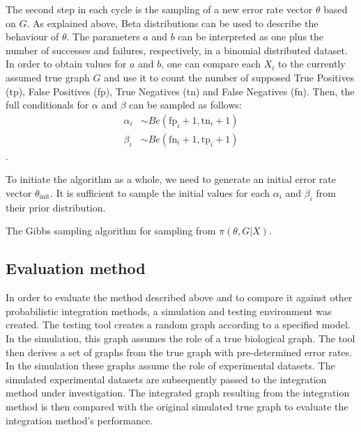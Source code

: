\documentclass{bioinfo}
\begin{document}
\begin{methods}
The second step in each cycle is the sampling of a new error rate vector $\theta$ based on $G$. 
As explained above, Beta distributions can be used to describe the behaviour of $\theta$.
The parameters $a$ and $b$ can be interpreted as one plus the number of successes and failures, respectively, in a binomial distributed dataset. In order to obtain values for $a$ and $b$, one can compare each $X_i$ to the currently assumed true graph $G$ and use it to count the number of supposed True Positives (tp), False Positives (fp), True Negatives (tn) and False Negatives (fn). Then, the full conditionals for $\alpha$ and $\beta$ can be sampled as follows:
\begin{align}
  \alpha_i &\sim Be(\text{fp}_i+1, \text{tn}_i+1)\\
  \beta_i &\sim Be(\text{fn}_i+1, \text{tp}_i+1)
\end{align}.

To initiate the algorithm as a whole, we need to generate an initial error rate vector $\theta_{\text{init}}$. It is sufficient to sample the initial values for each $\alpha_i$ and $\beta_i$ from their prior distribution.

\begin{pseudocode}
  \scriptsize 
  \caption{The Gibbs sampling algorithm for sampling from $\pi(\theta,G|X)$.}
\end{pseudocode}


\subsection{Evaluation method}

In order to evaluate the method described above and to compare it against other probabilistic integration methods, a simulation and testing environment was created. The testing tool creates a random graph according to a specified model. In the simulation, this graph assumes the role of a true biological graph. The tool then derives a set of graphs from the true graph with pre-determined error rates. In the simulation these graphs assume the role of experimental datasets. 
The simulated experimental datasets are subsequently passed to the integration method under investigation. The integrated graph resulting from the integration method is then compared with the original simulated true graph to evaluate the integration method's performance. 


\end{methods}
\end{document}
